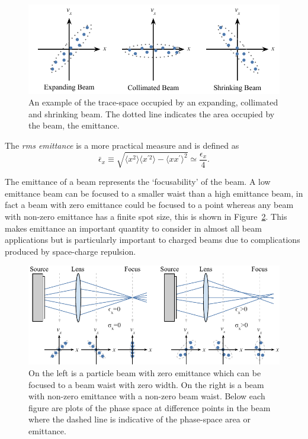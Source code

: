 \begin{figure}
\center
\includegraphics{part2/Figs/EmittanceExample.pdf}
\caption[Trace-space for expanding, collimated and shrinking beam.]{An example of the trace-space occupied by an expanding, collimated and shrinking beam. The dotted line indicates the area occupied by the beam, the emittance.}
\label{figure:emittance_example}
\end{figure}

The \emph{\gls{rms} emittance} is a more practical measure and is defined as
\begin{equation}\label{emittance}
\bar{\epsilon}_x \equiv \sqrt{\langle x^2\rangle \langle x^{\prime 2}\rangle - \langle x x^\prime\rangle^2} \simeq \frac{\epsilon_x}{4}.
\end{equation}

The emittance of a beam represents the `focusability' of the beam.
A low emittance beam can be focused to a smaller waist than a high emittance beam, in fact a beam with zero emittance could be focused to a point whereas any beam with non-zero emittance has a finite spot size, this is shown in Figure~\ref{figure:focusability}.
This makes emittance an important quantity to consider in almost all beam applications but is particularly important to charged beams due to complications produced by space-charge repulsion.

\begin{figure}
\center
\includegraphics{part2/Figs/EmittanceFocasability.pdf}
\caption[Comparison of zero and non-zero emittance.]{On the left is a particle beam with zero emittance which can be focused to a beam waist with zero width. On the right is a beam with non-zero emittance with a non-zero beam waist. Below each figure are plots of the phase space at difference points in the beam where the dashed line is indicative of the phase-space area or emittance.}
\label{figure:focusability}
\end{figure}

